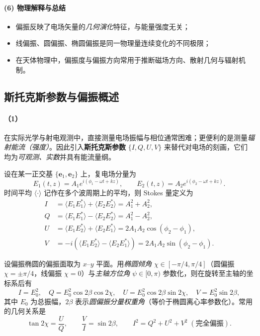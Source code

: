 \paragraph{(6) 物理解释与总结}
\begin{itemize}[leftmargin=2em]
  \item 偏振反映了电场矢量的\emph{几何演化}特征，与能量强度无关；
  \item 线偏振、圆偏振、椭圆偏振是同一物理量连续变化的不同极限；
  \item 在天体物理中，偏振度与偏振方向常用于推断磁场方向、散射几何与辐射机制。
\end{itemize}

\subsection{斯托克斯参数与偏振概述}\label{subsec:stokes}

\paragraph{（1）}在实际光学与射电观测中，直接测量电场振幅与相位通常困难；更便利的是测量\emph{辐射能流（强度）}。因此引入\textbf{斯托克斯参数} $\{I,Q,U,V\}$ 来替代对电场的刻画，它们均为\emph{可观测、实数}并具有能流量纲。

设在某一正交基 $\{\mathbf e_1,\mathbf e_2\}$ 上，复电场分量为
\[
E_1(t,z)=A_1 e^{i(\phi_1 - \omega t + kz)},\qquad
E_2(t,z)=A_2 e^{i(\phi_2 - \omega t + kz)} .
\]
时间平均 $\langle\cdot\rangle$ 记作在多个波周期上的平均，则 Stokes 量定义为
\begin{align}
I &= \langle E_1 E_1^\ast\rangle + \langle E_2 E_2^\ast\rangle = A_1^2 + A_2^2, \\
Q &= \langle E_1 E_1^\ast\rangle - \langle E_2 E_2^\ast\rangle = A_1^2 - A_2^2, \\
U &= \langle E_1 E_2^\ast\rangle + \langle E_2 E_1^\ast\rangle = 2A_1A_2\cos(\phi_2-\phi_1),\\
V &= -i\!\left(\langle E_1 E_2^\ast\rangle - \langle E_2 E_1^\ast\rangle\right)=2A_1A_2\sin(\phi_2-\phi_1).
\end{align}

\begin{derivationnote}[与椭圆偏振参数的联系]
设偏振椭圆的偏振面取为 $x$–$y$ 平面。用\emph{椭圆倾角} $\chi\in[-\pi/4,\pi/4]$（圆偏振 $\chi=\pm\pi/4$，线偏振 $\chi=0$）与\emph{主轴方位角} $\psi\in[0,\pi)$ 参数化，则在旋转至主轴的坐标系后有
\[
I=E_0^2,\quad Q=E_0^2\cos2\beta\cos2\chi,\quad U=E_0^2\cos2\beta\sin2\chi,\quad V=E_0^2\sin2\beta,
\]
其中 $E_0$ 为总振幅，$2\beta$ 表示\emph{圆偏振分量权重角}（等价于椭圆离心率参数化）。常用的几何关系是
\[
\tan 2\chi = \frac{U}{Q},\qquad \frac{V}{I}=\sin 2\beta,\qquad I^2=Q^2+U^2+V^2\; (\text{完全偏振}).
\]
\end{derivationnote}

